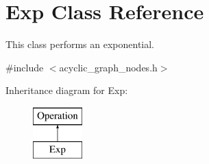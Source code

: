 \hypertarget{classExp}{}\section{Exp Class Reference}
\label{classExp}


This class performs an exponential.  




{\ttfamily \#include $<$acyclic\+\_\+graph\+\_\+nodes.\+h$>$}

Inheritance diagram for Exp\+:\begin{figure}[H]
\begin{center}
\leavevmode
\includegraphics[height=2.000000cm]{classExp}
\end{center}
\end{figure}
